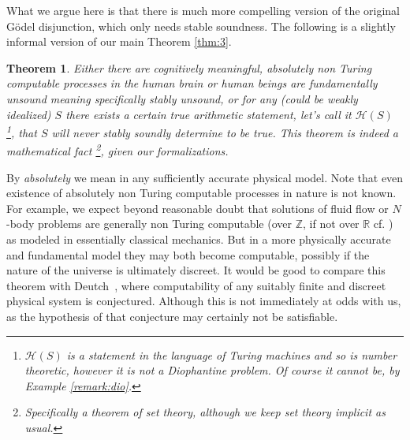 \documentclass{amsart}  %
\numberwithin{equation}{section}
\newtheorem{theorem}[equation]{Theorem}
\theoremstyle{definition}
\theoremstyle{remark}
\begin{document}
{What we argue here is that there is much more compelling version of the original G\"odel disjunction, which only needs stable soundness. 
The following is a slightly informal version of our main Theorem \ref{thm:3}.
\begin{theorem} \label{thm:1} Either there are cognitively meaningful, absolutely non Turing computable processes in the human brain or human beings are fundamentally unsound meaning specifically stably unsound, or for any (could be weakly idealized) $S$ there exists a certain true arithmetic statement, let's call it $\mathcal{H} (S)$ \footnote {$\mathcal{H} (S)$ is a statement in the language of Turing machines and so is number theoretic, however it is not a Diophantine problem. Of course it cannot be, by Example \ref{remark:dio}.}, that $S$ will never stably soundly determine to be true. This theorem is indeed a mathematical fact \footnote{Specifically a theorem of set theory, although we keep set theory implicit as usual.}, given our formalizations.  
\end{theorem} By \emph{absolutely} we mean in any sufficiently accurate physical model. Note that even existence of absolutely non Turing computable processes in nature is not known. For example, we expect beyond reasonable doubt that solutions of fluid flow or $N$-body problems are generally non Turing computable (over $\mathbb{Z}$, if not over $\mathbb{R}$ cf. \cite{citeBlumShubSmalen}) as modeled in essentially classical mechanics.  But in a more physically accurate and fundamental model they may both become computable, possibly if the nature of the universe is ultimately discreet. It would be good to compare this theorem with Deutch~\cite{citeDeutsch}, where computability of any suitably finite and discreet physical system is conjectured. Although this is not immediately at odds with us, as the hypothesis of that conjecture may certainly not be satisfiable. 

}
\end{document}
